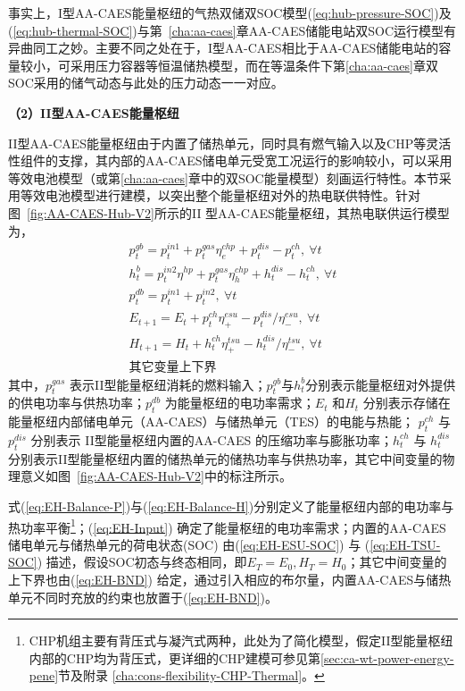 事实上，I型AA-CAES能量枢纽的气热双储双SOC模型(\ref{eq:hub-pressure-SOC})及(\ref{eq:hub-thermal-SOC})与第~\ref{cha:aa-caes}章AA-CAES储能电站双SOC运行模型有异曲同工之妙。主要不同之处在于，I型AA-CAES相比于AA-CAES储能电站的容量较小，可采用压力容器等恒温储热模型，而在等温条件下第\ref{cha:aa-caes}章双SOC采用的储气动态与此处的压力动态一一对应。

\textbf{（2）II型AA-CAES能量枢纽}

II型AA-CAES能量枢纽由于内置了储热单元，同时具有燃气输入以及CHP等灵活性组件的支撑，其内部的AA-CAES储电单元受宽工况运行的影响较小，可以采用等效电池模型（或第\ref{cha:aa-caes}章中的双SOC能量模型）刻画运行特性。本节采用等效电池模型进行建模，以突出整个能量枢纽对外的热电联供特性。针对图~\ref{fig:AA-CAES-Hub-V2}所示的II 型AA-CAES能量枢纽，其热电联供运行模型为，
\begin{subequations}
\label{eq:EH-Cons-II}
\begin{gather}
p_t^{gb} = p_t^{in1} + p_t^{gas} \eta^{chp}_e + p_t^{dis} - p_t^{ch},~ \forall t  \label{eq:EH-Balance-P} \\
h_t^{b} = p_t^{in2} \eta^{hp} + p_t^{gas} \eta^{chp}_h + h_t^{dis} - h_t^{ch},~ \forall t  \label{eq:EH-Balance-H} \\
p_t^{db} = p_t^{in1} + p_t^{in2},~ \forall t  \label{eq:EH-Input} \\
E_{t+1} = E_t + p_t^{ch} \eta^{esu}_+ - p_t^{dis}/\eta^{esu}_-,~\forall t \label{eq:EH-ESU-SOC} \\
H_{t+1} = H_t + h_t^{ch} \eta^{tsu}_+ - h_t^{dis}/\eta^{tsu}_-,~ \forall t \label{eq:EH-TSU-SOC} \\
\mbox{其它变量上下界}   \label{eq:EH-BND}
\end{gather}
\end{subequations}
其中，$p_t^{gas}$ 表示II型能量枢纽消耗的燃料输入；$p_t^{gb}$与$h_t^b$分别表示能量枢纽对外提供的供电功率与供热功率；$p_t^{db}$ 为能量枢纽的电功率需求；$E_t$ 和$H_t$ 分别表示存储在能量枢纽内部储电单元（AA-CAES）与储热单元（TES）的电能与热能； $p_t^{ch}$ 与 $p_t^{dis}$ 分别表示 II型能量枢纽内置的AA-CAES 的压缩功率与膨胀功率；$h_t^{ch}$ 与 $h_t^{dis}$分别表示II型能量枢纽内置的储热单元的储热功率与供热功率，其它中间变量的物理意义如图~\ref{fig:AA-CAES-Hub-V2}中的标注所示。

式(\ref{eq:EH-Balance-P})与(\ref{eq:EH-Balance-H})分别定义了能量枢纽内部的电功率与热功率平衡\footnote{CHP机组主要有背压式与凝汽式两种，此处为了简化模型，假定II型能量枢纽内部的CHP均为背压式，更详细的CHP建模可参见第\ref{sec:ca-wt-power-energy-pene}节及附录
\ref{cha:cons-flexibility-CHP-Thermal}。}；(\ref{eq:EH-Input}) 确定了能量枢纽的电功率需求；内置的AA-CAES 储电单元与储热单元的荷电状态(SOC) 由(\ref{eq:EH-ESU-SOC}) 与 (\ref{eq:EH-TSU-SOC}) 描述，假设SOC初态与终态相同，即$E_{T} = E_{0}, H_{T} = H_{0}$；其它中间变量的上下界也由(\ref{eq:EH-BND}) 给定，通过引入相应的布尔量，内置AA-CAES与储热单元不同时充放的约束也放置于(\ref{eq:EH-BND})。

